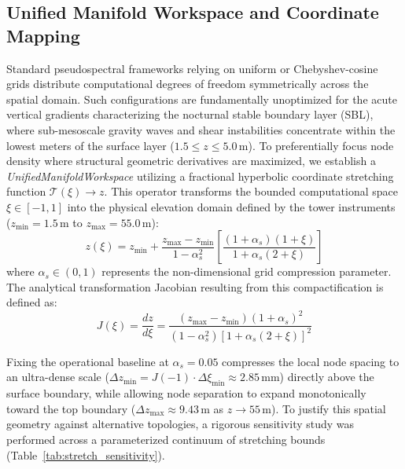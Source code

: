 \subsection{Unified Manifold Workspace and Coordinate Mapping}
\label{sec:methods:manifold}

Standard pseudospectral frameworks relying on uniform or Chebyshev-cosine grids distribute computational degrees of freedom symmetrically across the spatial domain. Such configurations are fundamentally unoptimized for the acute vertical gradients characterizing the nocturnal stable boundary layer (SBL), where sub-mesoscale gravity waves and shear instabilities concentrate within the lowest meters of the surface layer ($1.5 \le z \le 5.0\,\text{m}$). To preferentially focus node density where structural geometric derivatives are maximized, we establish a \emph{UnifiedManifoldWorkspace} utilizing a fractional hyperbolic coordinate stretching function $\mathcal{T}(\xi) \rightarrow z$. This operator transforms the bounded computational space $\xi \in [-1, 1]$ into the physical elevation domain defined by the tower instruments ($z_{\min} = 1.5\,\text{m}$ to $z_{\max} = 55.0\,\text{m}$):
\begin{equation}
z(\xi) = z_{\min} + \frac{z_{\max} - z_{\min}}{1 - \alpha_s^2} \left[ \frac{(1+\alpha_s)(1+\xi)}{1 + \alpha_s(2+\xi)} \right]
\label{eq:hyperbolic_stretch}
\end{equation}
where $\alpha_s \in (0, 1)$ represents the non-dimensional grid compression parameter. The analytical transformation Jacobian resulting from this compactification is defined as:
\begin{equation}
J(\xi) = \frac{dz}{d\xi} = \frac{(z_{\max} - z_{\min})(1 + \alpha_s)^2}{(1 - \alpha_s^2) \left[1 + \alpha_s(2+\xi)\right]^2}
\label{eq:jacobian_stretched}
\end{equation}

Fixing the operational baseline at $\alpha_s = 0.05$ compresses the local node spacing to an ultra-dense scale ($\Delta z_{\min} = J(-1) \cdot \Delta \xi_{\min} \approx 2.85\,\text{mm}$) directly above the surface boundary, while allowing node separation to expand monotonically toward the top boundary ($\Delta z_{\max} \approx 9.43\,\text{m}$ as $z \rightarrow 55\,\text{m}$). To justify this spatial geometry against alternative topologies, a rigorous sensitivity study was performed across a parameterized continuum of stretching bounds (Table~\ref{tab:stretch_sensitivity}).


